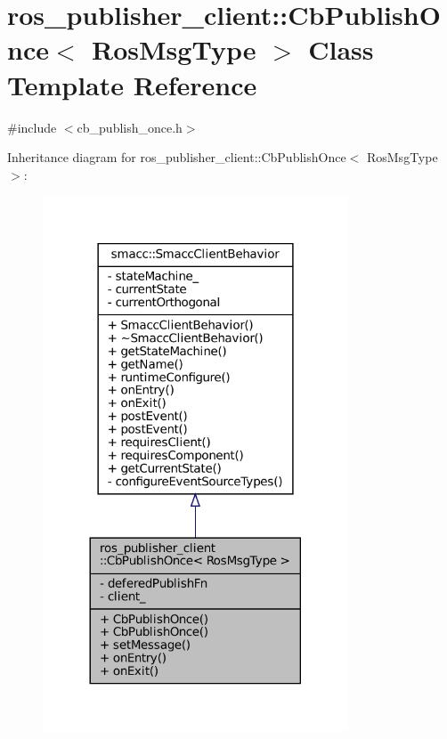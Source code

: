 \hypertarget{classros__publisher__client_1_1CbPublishOnce}{}\section{ros\+\_\+publisher\+\_\+client\+:\+:Cb\+Publish\+Once$<$ Ros\+Msg\+Type $>$ Class Template Reference}
\label{classros__publisher__client_1_1CbPublishOnce}


{\ttfamily \#include $<$cb\+\_\+publish\+\_\+once.\+h$>$}



Inheritance diagram for ros\+\_\+publisher\+\_\+client\+:\+:Cb\+Publish\+Once$<$ Ros\+Msg\+Type $>$\+:
\nopagebreak
\begin{figure}[H]
\begin{center}
\leavevmode
\includegraphics[width=257pt]{classros__publisher__client_1_1CbPublishOnce__inherit__graph}
\end{center}
\end{figure}


